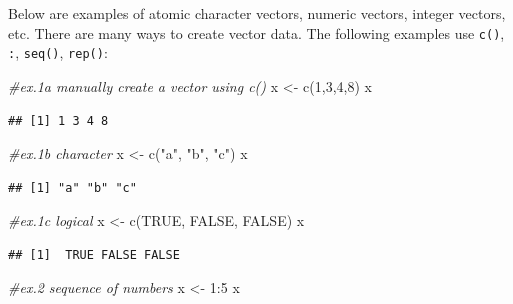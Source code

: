 \documentclass[
]{book}
\newenvironment{Shaded}{\begin{snugshade}}{\end{snugshade}}
\newcommand{\CommentTok}[1]{\textcolor[rgb]{0.56,0.35,0.01}{\textit{#1}}}
\newcommand{\ConstantTok}[1]{\textcolor[rgb]{0.00,0.00,0.00}{#1}}
\newcommand{\DecValTok}[1]{\textcolor[rgb]{0.00,0.00,0.81}{#1}}
\newcommand{\FunctionTok}[1]{\textcolor[rgb]{0.00,0.00,0.00}{#1}}
\newcommand{\NormalTok}[1]{#1}
\newcommand{\OtherTok}[1]{\textcolor[rgb]{0.56,0.35,0.01}{#1}}
\newcommand{\SpecialCharTok}[1]{\textcolor[rgb]{0.00,0.00,0.00}{#1}}
\newcommand{\StringTok}[1]{\textcolor[rgb]{0.31,0.60,0.02}{#1}}
\begin{document}
Below are examples of atomic character vectors, numeric vectors, integer vectors, etc. There are many ways to create vector data. The following examples use \texttt{c()}, \texttt{:}, \texttt{seq()}, \texttt{rep()}:

\begin{Shaded}
\begin{Highlighting}[]
\CommentTok{\#ex.1a manually create a vector using c()}
\NormalTok{x }\OtherTok{\textless{}{-}} \FunctionTok{c}\NormalTok{(}\DecValTok{1}\NormalTok{,}\DecValTok{3}\NormalTok{,}\DecValTok{4}\NormalTok{,}\DecValTok{8}\NormalTok{)}
\NormalTok{x}
\end{Highlighting}
\end{Shaded}

\begin{verbatim}
## [1] 1 3 4 8
\end{verbatim}

\begin{Shaded}
\begin{Highlighting}[]
\CommentTok{\#ex.1b character}
\NormalTok{x }\OtherTok{\textless{}{-}} \FunctionTok{c}\NormalTok{(}\StringTok{"a"}\NormalTok{, }\StringTok{"b"}\NormalTok{, }\StringTok{"c"}\NormalTok{)}
\NormalTok{x}
\end{Highlighting}
\end{Shaded}

\begin{verbatim}
## [1] "a" "b" "c"
\end{verbatim}

\begin{Shaded}
\begin{Highlighting}[]
\CommentTok{\#ex.1c logical}
\NormalTok{x }\OtherTok{\textless{}{-}} \FunctionTok{c}\NormalTok{(}\ConstantTok{TRUE}\NormalTok{, }\ConstantTok{FALSE}\NormalTok{, }\ConstantTok{FALSE}\NormalTok{)}
\NormalTok{x}
\end{Highlighting}
\end{Shaded}

\begin{verbatim}
## [1]  TRUE FALSE FALSE
\end{verbatim}

\begin{Shaded}
\begin{Highlighting}[]
\CommentTok{\#ex.2 sequence of numbers}
\NormalTok{x }\OtherTok{\textless{}{-}} \DecValTok{1}\SpecialCharTok{:}\DecValTok{5}
\NormalTok{x}
\end{Highlighting}
\end{Shaded}
\end{document}
